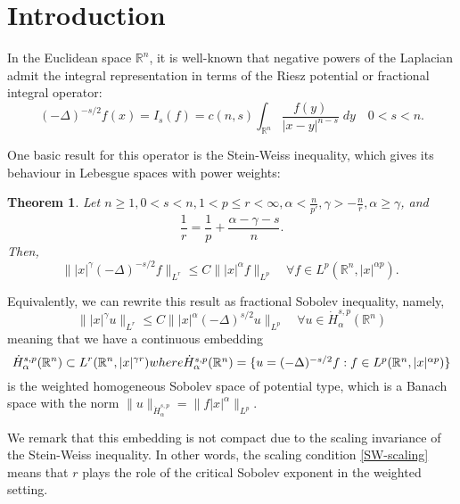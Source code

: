 \documentclass[12pt]{amsart}
\newcommand {\R}{\mathbb{R}}
\newcommand {\be}{\begin{equation}}
\newcommand {\ee}{\end{equation}}
\newtheorem{theorem}{Theorem}[section]
\begin{document}
\maketitle

\section{Introduction}

In the Euclidean space $\R^n$, it is well-known that negative powers of the
Laplacian admit the integral representation in terms of the Riesz potential
or fractional integral operator: 
$$ 
(-\Delta)^{-s/2} f(x)= I_s(f) = c(n,s) \int_{\R^n} \frac{f(y)}{|x-y|^{n-s}} \; dy
\quad 0 < s < n.
$$

One basic result for this operator is the Stein-Weiss inequality, which gives its behaviour in Lebesgue spaces with 
power weights:

\begin{theorem}\cite[Theorem $B^*$]{SW} \label{SW}
Let $n \geq 1, 0<s<n, 1<p \leq r<\infty, \alpha<\frac{n}{p'},
\gamma>-\frac{n}{r}, \alpha \ge  \gamma $, and
\be \frac{1}{r}=\frac{1}{p}+\frac{\alpha-\gamma-s}{n}. \label{SW-scaling} \ee 
Then,
\be
\| |x|^{\gamma} (-\Delta)^{-s/2} f  \|_{L^r}  \leq C \| |x|^\alpha f  \|_{L^p} \quad \forall f\in L^p(\R^n,|x|^{\alpha p}).\; \label{SW-ineq}
\ee
\end{theorem}

Equivalently, we can rewrite this result as fractional Sobolev
inequality, namely,
\be \| |x|^{\gamma} u  \|_{L^r}  \leq C \| |x|^\alpha (-\Delta)^{s/2} u  
\|_{L^p} \quad \forall u \in \dot{H}^{s,p}_\alpha(\R^n) \label{fractional-Sobolev} \ee
 meaning that we
have a continuous embedding
\be 
\dot{H}^{s,p}_\alpha(\R^n) \subset L^r(\R^n,|x|^{\gamma r})$$
where 
$$ \dot{H}^{s,p}_\alpha(\R^n) = \{ u = (-\Delta)^{-s/2} f : f \in 
L^p(\R^n,|x|^{\alpha p}) \} \label{Sobolev-definition}
\ee
is the weighted
homogeneous Sobolev space of potential
type,
 which is a Banach space with the norm $ \| u \|_{\dot{H}^{s,p}_\alpha} = \| f |x|^\alpha \|_{L^p}.$

\medskip
 
We remark that this embedding is not compact due to the scaling invariance
of the Stein-Weiss inequality. In other words, the scaling condition \eqref{SW-scaling} means that $r$ plays the role of the
critical Sobolev exponent in the weighted setting. 

\medskip 
\end{document}
